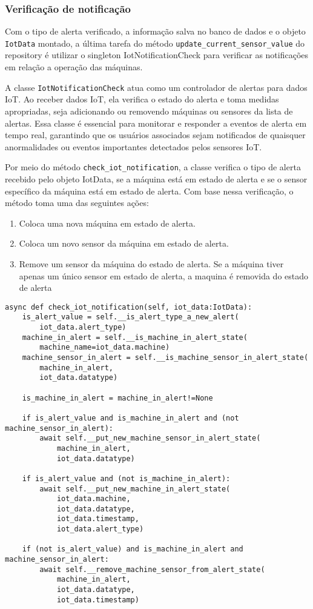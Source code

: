\subsubsection{Verificação de notificação}
Com o tipo de alerta verificado, a informação salva no banco de dados e o objeto \texttt{IotData} montado, a última tarefa do método \texttt{update\_current\_sensor\_value} do repository é utilizar o singleton IotNotificationCheck para verificar as notificações em relação a operação das máquinas.

A classe \texttt{IotNotificationCheck} atua como um controlador de alertas para dados IoT. Ao receber dados IoT, ela verifica o estado do alerta e toma medidas apropriadas, seja adicionando ou removendo máquinas ou sensores da lista de alertas. Essa classe é essencial para monitorar e responder a eventos de alerta em tempo real, garantindo que os usuários associados sejam notificados de quaisquer anormalidades ou eventos importantes detectados pelos sensores IoT.

Por meio do método \texttt{check\_iot\_notification}, a classe verifica o tipo de alerta recebido pelo objeto IotData, se a máquina está em estado de alerta e se o sensor específico da máquina está em estado de alerta. Com base nessa verificação, o método toma uma das seguintes ações:

\begin{enumerate}
    \item Coloca uma nova máquina em estado de alerta.
    \item Coloca um novo sensor da máquina em estado de alerta.
    \item Remove um sensor da máquina do estado de alerta. Se a máquina tiver apenas um único sensor em estado de alerta, a maquina é removida do estado de alerta
\end{enumerate}


\begin{verbatim}
async def check_iot_notification(self, iot_data:IotData):
    is_alert_value = self.__is_alert_type_a_new_alert(
        iot_data.alert_type)
    machine_in_alert = self.__is_machine_in_alert_state(
        machine_name=iot_data.machine)
    machine_sensor_in_alert = self.__is_machine_sensor_in_alert_state(
        machine_in_alert,
        iot_data.datatype)

    is_machine_in_alert = machine_in_alert!=None

    if is_alert_value and is_machine_in_alert and (not machine_sensor_in_alert):
        await self.__put_new_machine_sensor_in_alert_state(
            machine_in_alert,
            iot_data.datatype)

    if is_alert_value and (not is_machine_in_alert):
        await self.__put_new_machine_in_alert_state(
            iot_data.machine,
            iot_data.datatype,
            iot_data.timestamp,
            iot_data.alert_type)

    if (not is_alert_value) and is_machine_in_alert and machine_sensor_in_alert:
        await self.__remove_machine_sensor_from_alert_state(
            machine_in_alert,
            iot_data.datatype,
            iot_data.timestamp)
\end{verbatim}

